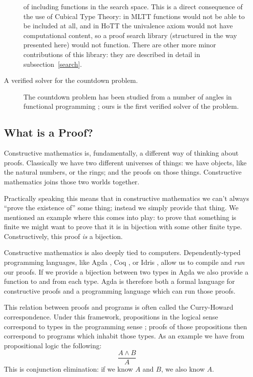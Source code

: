 \begin{description}
    of including functions in the search space.
    This is a direct consequence of the use of Cubical Type Theory: in MLTT
    functions would not be able to be included at all, and in HoTT the
    univalence axiom would not have computational content, so a proof search
    library (structured in the way presented here) would not function.
    There are other more minor contributions of this library: they are described
    in detail in subsection~\ref{search}.
  \item[A verified solver for the countdown problem.]
    The countdown problem \citep{huttonCountdownProblem2002} has been studied
    from a number of angles in functional programming
    \cite{birdCountdownCaseStudy2005}; ours is the first verified solver of the
    problem.
\end{description}


\subsection{What is a Proof?}
Constructive mathematics is, fundamentally, a different way of thinking about
proofs.
Classically we have two different universes of things: we have
objects, like the natural numbers, or the rings; and the proofs on those things.
Constructive mathematics joins those two worlds together.

Practically speaking this means that in constructive mathematics we can't
always ``prove the existence of'' some thing; instead we simply provide that
thing.
We mentioned an example where this comes into play: to prove that something is
finite we might want to prove that it is in bijection with some other finite
type.
Constructively, this proof \emph{is} a bijection.

Constructive mathematics is also deeply tied to computers.
Dependently-typed programming languages, like Agda
\citep{norellDependentlyTypedProgramming2008}, Coq
\citep{thecoqdevelopmentteamCoqProofAssistant2020}, or Idris
\citep{bradyIdrisGeneralpurposeDependently2013}, allow us to compile and
\emph{run} our proofs.
If we provide a bijection between two types in Agda we also provide a function
to and from each type.
Agda is therefore both a formal language for constructive proofs and a
programming language which can run those proofs.

This relation between proofs and programs is often called the Curry-Howard
correspondence.
Under this framework, propositions in the logical sense correspond to types in
the programming sense \citep{wadlerPropositionsTypes2015}; proofs of those
propositions then correspond to programs which inhabit those types.
As an example we have from propositional logic the following:
\begin{equation*}
  \frac{A \wedge B}{A}
\end{equation*}
This is conjunction elimination: if we know \(A\) and \(B\), we also know \(A\).

